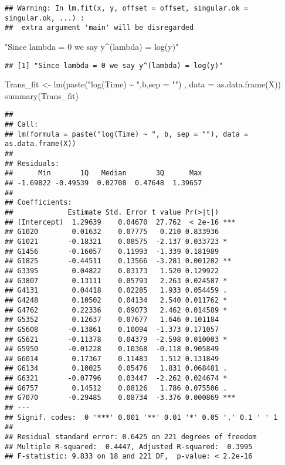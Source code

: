 \documentclass[
]{article}
\newenvironment{Shaded}{\begin{snugshade}}{\end{snugshade}}
\newcommand{\AttributeTok}[1]{\textcolor[rgb]{0.77,0.63,0.00}{#1}}
\newcommand{\FunctionTok}[1]{\textcolor[rgb]{0.00,0.00,0.00}{#1}}
\newcommand{\NormalTok}[1]{#1}
\newcommand{\OtherTok}[1]{\textcolor[rgb]{0.56,0.35,0.01}{#1}}
\newcommand{\StringTok}[1]{\textcolor[rgb]{0.31,0.60,0.02}{#1}}
\begin{document}
\begin{verbatim}
## Warning: In lm.fit(x, y, offset = offset, singular.ok = singular.ok, ...) :
##  extra argument 'main' will be disregarded
\end{verbatim}

\begin{Shaded}
\begin{Highlighting}[]
\StringTok{"Since lambda = 0 we say y\^{}(lambda) = log(y)"}
\end{Highlighting}
\end{Shaded}

\begin{verbatim}
## [1] "Since lambda = 0 we say y^(lambda) = log(y)"
\end{verbatim}

\begin{Shaded}
\begin{Highlighting}[]
\NormalTok{Trans\_fit }\OtherTok{\textless{}{-}} \FunctionTok{lm}\NormalTok{(}\FunctionTok{paste}\NormalTok{(}\StringTok{"log(Time) \textasciitilde{} "}\NormalTok{,b,}\AttributeTok{sep =} \StringTok{""}\NormalTok{)    , }\AttributeTok{data =} \FunctionTok{as.data.frame}\NormalTok{(X))}
\FunctionTok{summary}\NormalTok{(Trans\_fit)}
\end{Highlighting}
\end{Shaded}

\begin{verbatim}
## 
## Call:
## lm(formula = paste("log(Time) ~ ", b, sep = ""), data = as.data.frame(X))
## 
## Residuals:
##      Min       1Q   Median       3Q      Max 
## -1.69822 -0.49539  0.02708  0.47648  1.39657 
## 
## Coefficients:
##             Estimate Std. Error t value Pr(>|t|)    
## (Intercept)  1.29639    0.04670  27.762  < 2e-16 ***
## G1020        0.01632    0.07775   0.210 0.833936    
## G1021       -0.18321    0.08575  -2.137 0.033723 *  
## G1456       -0.16057    0.11993  -1.339 0.181989    
## G1825       -0.44511    0.13566  -3.281 0.001202 ** 
## G3395        0.04822    0.03173   1.520 0.129922    
## G3807        0.13111    0.05793   2.263 0.024587 *  
## G4131        0.04418    0.02285   1.933 0.054459 .  
## G4248        0.10502    0.04134   2.540 0.011762 *  
## G4762        0.22336    0.09073   2.462 0.014589 *  
## G5352        0.12637    0.07677   1.646 0.101184    
## G5608       -0.13861    0.10094  -1.373 0.171057    
## G5621       -0.11378    0.04379  -2.598 0.010003 *  
## G5950       -0.01228    0.10368  -0.118 0.905849    
## G6014        0.17367    0.11483   1.512 0.131849    
## G6134        0.10025    0.05476   1.831 0.068481 .  
## G6321       -0.07796    0.03447  -2.262 0.024674 *  
## G6757        0.14512    0.08126   1.786 0.075506 .  
## G7070       -0.29485    0.08734  -3.376 0.000869 ***
## ---
## Signif. codes:  0 '***' 0.001 '**' 0.01 '*' 0.05 '.' 0.1 ' ' 1
## 
## Residual standard error: 0.6425 on 221 degrees of freedom
## Multiple R-squared:  0.4447, Adjusted R-squared:  0.3995 
## F-statistic: 9.833 on 18 and 221 DF,  p-value: < 2.2e-16
\end{verbatim}
\end{document}
